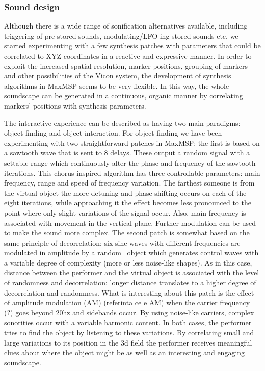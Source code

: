 \documentclass{nime-alternate}
\begin{document}
\subsubsection{Sound design}

Although there is a wide range of sonification alternatives available, including triggering of pre-stored sounds, modulating/LFO-ing stored sounds etc. we started experimenting with a few synthesis patches with parameters that could be correlated to XYZ coordinates in a reactive and expressive manner.  In order to exploit the increased spatial resolution, marker positions, grouping of markers and other possibilities of the Vicon system, the development of synthesis  algorithms in MaxMSP seems to be very flexible.  In this way, the whole soundscape can be generated in a continuous, organic manner by correlating markers’ positions with synthesis parameters. 

The interactive experience can be described as having two main paradigms: object finding and object interaction. For object finding we have been experimenting with two straightforward patches in MaxMSP: the first is based on a sawtooth wave that is sent to 8 delays. These output a random signal with a settable range which continuously alter the phase and frequency of the sawtooth iterations. This chorus-inspired algorithm has three controllable parameters: main frequency, range and speed of frequency variation. The farthest someone is from the virtual object the more detuning and phase shifting occurs on each of the eight iterations, while approaching it the effect becomes less pronounced to the point where only slight variations of the signal occur. Also, main frequency is associated with movement in the vertical plane. Further modulation can be used to make the sound more complex. The second patch is somewhat based on the same principle of decorrelation: six sine waves with different frequencies are modulated in amplitude by a random~ object which generates control waves with a variable degree of complexity (more or less noise-like shapes). As in this case, distance between the performer and the virtual object is associated with the level of randomness and decorrelation: longer distance translates to a higher degree of decorrelation and randomness. What is interesting about this patch is the effect of amplitude modulation (AM) (referinta ce e AM) when the carrier frequency (?) goes beyond 20hz and sidebands occur. By using noise-like carriers, complex sonorities occur with a variable harmonic content. In both cases, the performer tries to find the object by listening to these variations. By correlating small and large variations to its position in the 3d field the performer receives meaningful clues about where the object might be as well as an interesting and engaging soundscape. 
\end{document}
